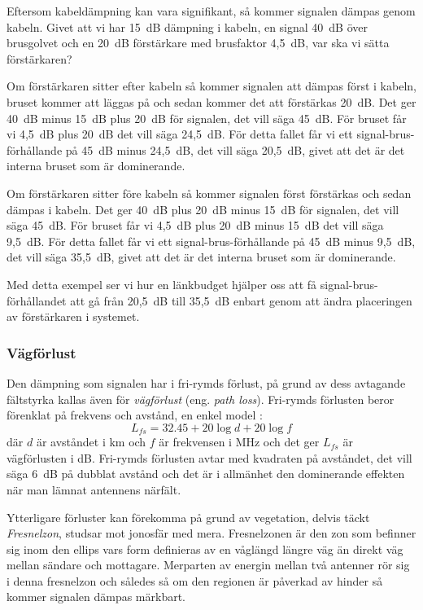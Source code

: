 Eftersom kabeldämpning kan vara signifikant, så kommer signalen dämpas genom
kabeln.
Givet att vi har 15~dB dämpning i kabeln, en signal 40~dB över brusgolvet och
en 20~dB förstärkare med brusfaktor 4,5~dB, var ska vi sätta förstärkaren?

Om förstärkaren sitter efter kabeln så kommer signalen att dämpas först i
kabeln, bruset kommer att läggas på och sedan kommer det att förstärkas 20~dB.
Det ger 40~dB minus 15~dB plus 20~dB för signalen, det vill säga 45~dB.
För bruset får vi 4,5~dB plus 20~dB det vill säga 24,5~dB.
För detta fallet får vi ett signal-brus-förhållande på 45~dB minus 24,5~dB,
det vill säga 20,5~dB, givet att det är det interna bruset som är dominerande.

Om förstärkaren sitter före kabeln så kommer signalen först förstärkas och
sedan dämpas i kabeln.
Det ger 40~dB plus 20~dB minus 15~dB för signalen, det vill säga 45~dB.
För bruset får vi 4,5~dB plus 20~dB minus 15~dB det vill säga 9,5~dB.
För detta fallet får vi ett signal-brus-förhållande på 45~dB minus 9,5~dB,
det vill säga 35,5~dB, givet att det är det interna bruset som är dominerande.

Med detta exempel ser vi hur en länkbudget hjälper oss att få
signal-brus-förhållandet att gå från 20,5~dB till 35,5~dB enbart genom att
ändra placeringen av förstärkaren i systemet.

\subsubsection{Vägförlust}

Den dämpning som signalen har i fri-rymds förlust, på grund av dess avtagande
fältstyrka kallas även för \emph{vägförlust} (eng. \emph{path loss}).
Fri-rymds förlusten beror förenklat på frekvens och avstånd, en enkel model
\cite[\S 19.1.2]{ARRLHDB2015}:
\[L_{fs} = 32.45 + 20\log d + 20\log f\]
där \(d\) är avståndet i km och \(f\) är frekvensen i MHz och det ger
\(L_{fs}\) är vägförlusten i dB.
Fri-rymds förlusten avtar med kvadraten på avståndet, det vill säga 6~dB på
dubblat avstånd och det är i allmänhet den dominerande effekten när man lämnat
antennens närfält.

Ytterligare förluster kan förekomma på grund av vegetation, delvis täckt
\emph{Fresnelzon}, studsar mot jonosfär med mera.
Fresnelzonen är den zon som befinner sig inom den ellips vars form definieras
av en våglängd längre väg än direkt väg mellan sändare och mottagare.
Merparten av energin mellan två antenner rör sig i denna fresnelzon och
således så om den regionen är påverkad av hinder så kommer signalen dämpas
märkbart.

